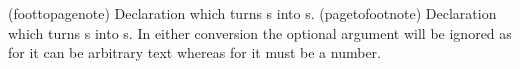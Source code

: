 \begin{syntax}
\cmd{\foottopagenote}\\ \cmd{\pagetofootnote} \\
\end{syntax}
\glossary(foottopagenote)%
  {}%
  {Declaration which turns s into s.}%
\glossary(pagetofootnote)%
  {}%
  {Declaration which turns s into s.}%
In either conversion the optional argument will be
ignored as for \cmd{\pagenote} it can be arbitrary text whereas for
\cmd{\footnote} it must be a number.








